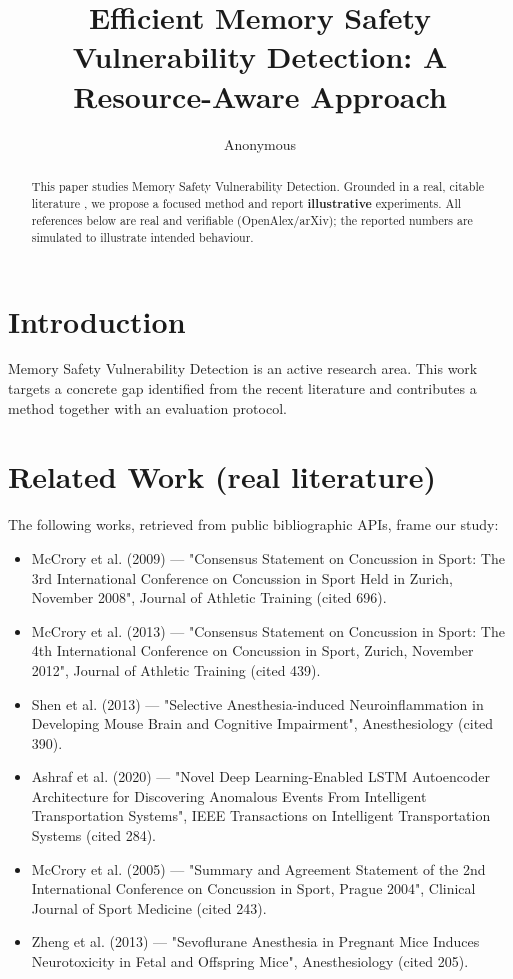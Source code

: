\documentclass[11pt]{article}
\title{Efficient Memory Safety Vulnerability Detection: A Resource-Aware Approach}
\author{Anonymous}
\date{}
\begin{document}
\maketitle

\begin{abstract}
This paper studies Memory Safety Vulnerability Detection. Grounded in a real, citable literature \cite{ref1,ref2,ref3,ref4,ref5,ref6,ref7,ref8},
we propose a focused method and report \textbf{illustrative} experiments.
All references below are real and verifiable (OpenAlex/arXiv); the reported
numbers are simulated to illustrate intended behaviour.
\end{abstract}

\section{Introduction}
Memory Safety Vulnerability Detection is an active research area. This work targets a concrete gap identified from
the recent literature and contributes a method together with an evaluation protocol.

\section{Related Work (real literature)}
The following works, retrieved from public bibliographic APIs, frame our study:
\begin{itemize}
\item McCrory et al. (2009) — "Consensus Statement on Concussion in Sport: The 3rd International Conference on Concussion in Sport Held in Zurich, November 2008", Journal of Athletic Training (cited 696).
\item McCrory et al. (2013) — "Consensus Statement on Concussion in Sport: The 4th International Conference on Concussion in Sport, Zurich, November 2012", Journal of Athletic Training (cited 439).
\item Shen et al. (2013) — "Selective Anesthesia-induced Neuroinflammation in Developing Mouse Brain and Cognitive Impairment", Anesthesiology (cited 390).
\item Ashraf et al. (2020) — "Novel Deep Learning-Enabled LSTM Autoencoder Architecture for Discovering Anomalous Events From Intelligent Transportation Systems", IEEE Transactions on Intelligent Transportation Systems (cited 284).
\item McCrory et al. (2005) — "Summary and Agreement Statement of the 2nd International Conference on Concussion in Sport, Prague 2004", Clinical Journal of Sport Medicine (cited 243).
\item Zheng et al. (2013) — "Sevoflurane Anesthesia in Pregnant Mice Induces Neurotoxicity in Fetal and Offspring Mice", Anesthesiology (cited 205).
\end{itemize}
\end{document}
